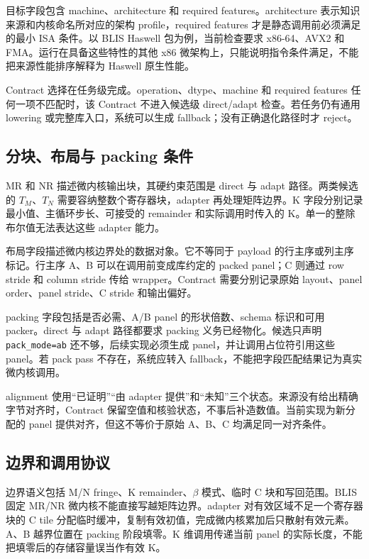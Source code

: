 目标字段包含 machine、architecture 和 required features。architecture 表示知识来源和内核命名所对应的架构 profile，required features 才是静态调用前必须满足的最小 ISA 条件。以 BLIS Haswell 包为例，当前检查要求 x86-64、AVX2 和 FMA。运行在具备这些特性的其他 x86 微架构上，只能说明指令条件满足，不能把来源性能排序解释为 Haswell 原生性能。

Contract 选择在任务级完成。operation、dtype、machine 和 required features 任何一项不匹配时，该 Contract 不进入候选级 direct/adapt 检查。若任务仍有通用 lowering 或完整库入口，系统可以生成 fallback；没有正确退化路径时才 reject。

\subsection{分块、布局与 packing 条件}

MR 和 NR 描述微内核输出块，其硬约束范围是 direct 与 adapt 路径。两类候选的 $T_M$、$T_N$ 需要容纳整数个寄存器块，adapter 再处理矩阵边界。K 字段分别记录最小值、主循环步长、可接受的 remainder 和实际调用时传入的 K。单一的整除布尔值无法表达这些 adapter 能力。

布局字段描述微内核边界处的数据对象。它不等同于 payload 的行主序或列主序标记。行主序 A、B 可以在调用前变成库约定的 packed panel；C 则通过 row stride 和 column stride 传给 wrapper。Contract 需要分别记录原始 layout、panel order、panel stride、C stride 和输出偏好。

packing 字段包括是否必需、A/B panel 的形状倍数、schema 标识和可用 packer。direct 与 adapt 路径都要求 packing 义务已经物化。候选只声明 \texttt{pack\_mode=ab} 还不够，后续实现必须生成 panel，并让调用占位符引用这些 panel。若 pack pass 不存在，系统应转入 fallback，不能把字段匹配结果记为真实微内核调用。

alignment 使用“已证明”“由 adapter 提供”和“未知”三个状态。来源没有给出精确字节对齐时，Contract 保留空值和核验状态，不事后补造数值。当前实现为新分配的 panel 提供对齐，但这不等价于原始 A、B、C 均满足同一对齐条件。

\subsection{边界和调用协议}

边界语义包括 M/N fringe、K remainder、$\beta$ 模式、临时 C 块和写回范围。BLIS 固定 MR/NR 微内核不能直接写越矩阵边界。adapter 对有效区域不足一个寄存器块的 C tile 分配临时缓冲，复制有效初值，完成微内核累加后只散射有效元素。A、B 越界位置在 packing 阶段填零。K 维调用传递当前 panel 的实际长度，不能把填零后的存储容量误当作有效 K。

